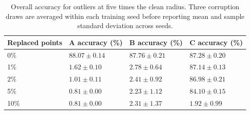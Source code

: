 \begin{table}[!ht]\centering\small
\begin{tabular}{llll}
\toprule Replaced points & A accuracy (\%) & B accuracy (\%) & C accuracy (\%)\\\midrule
0\% & $88.07 \pm 0.14$ & $87.76 \pm 0.21$ & $87.28 \pm 0.20$\\
1\% & $1.62 \pm 0.10$ & $2.78 \pm 0.64$ & $87.14 \pm 0.13$\\
2\% & $1.01 \pm 0.11$ & $2.41 \pm 0.92$ & $86.98 \pm 0.21$\\
5\% & $0.81 \pm 0.00$ & $2.23 \pm 1.12$ & $84.10 \pm 0.15$\\
10\% & $0.81 \pm 0.00$ & $2.31 \pm 1.37$ & $1.92 \pm 0.99$\\
\bottomrule\end{tabular}
\caption{Overall accuracy for outliers at five times the clean radius. Three corruption draws are averaged within each training seed before reporting mean and sample standard deviation across seeds.}\end{table}